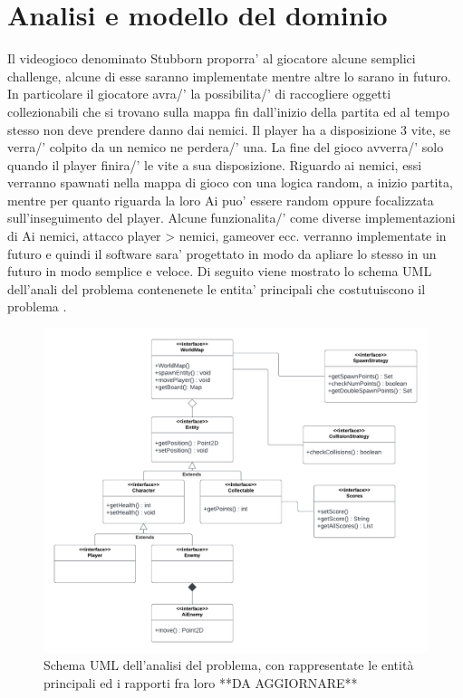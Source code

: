 \documentclass[a4paper,12pt]{report}
\begin{document}
\section{Analisi e modello del dominio}
Il videogioco denominato Stubborn proporra' al giocatore alcune semplici challenge, alcune di esse saranno implementate mentre altre lo sarano in futuro.
In particolare il giocatore avra/' la possibilita/' di raccogliere oggetti collezionabili che si trovano sulla mappa fin dall'inizio della partita ed al tempo stesso non deve prendere danno dai nemici.
Il player ha a disposizione 3 vite, se verra/' colpito da un nemico ne perdera/' una.
La fine del gioco avverra/' solo quando il player finira/' le vite a sua disposizione.
Riguardo ai nemici, essi verranno spawnati nella mappa di gioco con una logica random, a inizio partita, mentre per quanto riguarda la loro Ai puo' essere random oppure focalizzata sull'inseguimento del player.
Alcune funzionalita/' come diverse implementazioni di Ai nemici, attacco player > nemici, gameover ecc. verranno implementate in futuro e quindi il software sara' progettato in modo da apliare lo stesso in un futuro in modo semplice e veloce.
Di seguito viene mostrato lo schema UML dell'anali del problema contenenete le entita' principali che costutuiscono il problema .

\begin{figure}[H]
\centering{}
\includegraphics[width=\textwidth,height=\textheight,keepaspectratio]{img/analysisUML.pdf}
\caption{Schema UML dell'analisi del problema, con rappresentate le entità principali ed i rapporti fra loro **DA AGGIORNARE**}
\label{img:analysisUML}
\end{figure}
\end{document}
